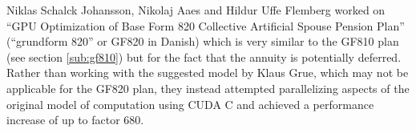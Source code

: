 Niklas Schalck Johansson, Nikolaj Aaes and Hildur Uffe Flemberg worked on ``GPU Optimization of Base Form 820 Collective Artificial Spouse Pension Plan''\cite{aaesjohanssonflemberg} (``grundform 820'' or GF820 in Danish) which is very similar to the GF810 plan (see section \ref{sub:gf810}) but for the fact that the annuity is potentially deferred. 
Rather than working with the suggested model by Klaus Grue, which may not be applicable for the GF820 plan, they instead attempted parallelizing aspects of the original model of computation using CUDA C and achieved a performance increase of up to factor 680.
